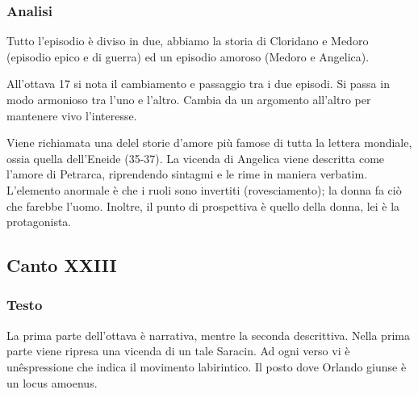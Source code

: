 \documentclass[a4paper]{article}
\begin{document}
\subsubsection{Analisi}

Tutto l'episodio è diviso in due,
abbiamo la storia di Cloridano e Medoro (episodio epico e di guerra)
ed un episodio amoroso (Medoro e Angelica).

All'ottava 17 si nota il cambiamento e passaggio tra i due episodi.
Si passa in modo armonioso tra l'uno e l'altro.
Cambia da un argomento all'altro per mantenere vivo l'interesse.

Viene richiamata una delel storie d'amore più famose di tutta la lettera mondiale,
ossia quella dell'Eneide (35-37).
La vicenda di Angelica viene descritta come l'amore di Petrarca, riprendendo sintagmi
e le rime in maniera verbatim.
L'elemento anormale è che i ruoli sono invertiti (rovesciamento); la donna
fa ciò che farebbe l'uomo. Inoltre, il punto di prospettiva è quello della donna,
lei è la protagonista.

\pagebreak

\subsection{Canto XXIII}

\subsubsection{Testo}

\begin{center} %
\begin{minipage}{0.5\textwidth}
\centering
{}
\end{minipage}
\end{center}

La prima parte dell'ottava è narrativa, mentre la seconda descrittiva.
Nella prima parte viene ripresa una vicenda di un tale Saracin.
Ad ogni verso vi è unêspressione che indica il movimento labirintico.
Il posto dove Orlando giunse è un locus amoenus.
\end{document}
